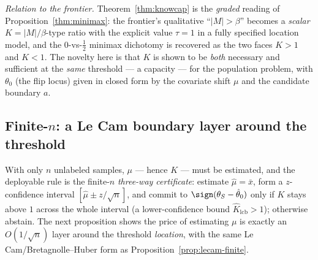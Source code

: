 \smallskip\noindent\emph{Relation to the frontier.}
Theorem~\ref{thm:knowcap} is the \emph{graded} reading of
Proposition~\ref{thm:minimax}: the frontier's qualitative ``$|M|>\beta$'' becomes a
\emph{scalar} $K=|M|/\beta$-type ratio with the explicit value $\tau=1$ in a fully
specified location model, and the $0$-vs-$\tfrac12$ minimax dichotomy is recovered
as the two faces $K>1$ and $K<1$. The novelty here is that $K$ is shown to be
\emph{both} necessary and sufficient at the \emph{same} threshold --- a capacity ---
for the population problem, with $\theta_0$ (the flip locus) given in closed form by
the covariate shift $\mu$ and the candidate boundary $a$.

\subsection{Finite-$n$: a Le Cam boundary layer around the threshold}\label{sec:knowcap-finiten}
With only $n$ unlabeled samples, $\mu$ --- hence $K$ --- must be estimated, and the
deployable rule is the finite-$n$ \emph{three-way certificate}: estimate
$\hat\mu=\bar x$, form a $z$-confidence interval $[\hat\mu\pm z/\sqrt n]$, and commit
to $\sign(\theta_S-\hat\theta_0)$ only if $K$ stays above $1$ across the whole
interval (a lower-confidence bound $\hat K_{\mathrm{lcb}}>1$); otherwise abstain.
The next proposition shows the price of estimating $\mu$ is exactly an
$O(1/\sqrt n)$ layer around the threshold \emph{location}, with the same Le
Cam/Bretagnolle--Huber form as Proposition~\ref{prop:lecam-finite}.

